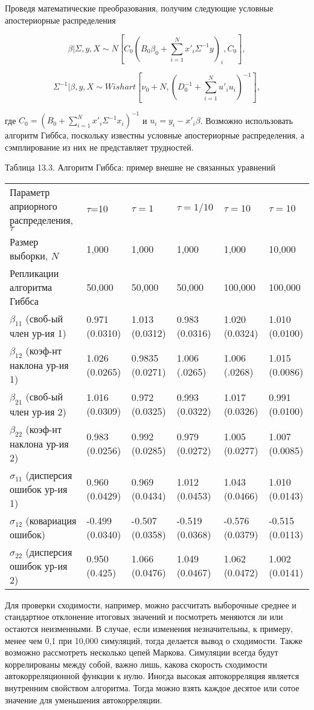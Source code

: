Проведя математические преобразования, получим следующие условные апостериорные распределения

\[
\beta|\Sigma,y,X{\sim}N\left[C_{0}\left(B_{0}\beta_{0}+\sum^{N}_{i=1}x'_{i}\Sigma^{-1}y\right)_{i},C_0\right], 
\]

\[
\Sigma^{-1}|\beta,y,X{\sim} Wishart \left[\nu_{0}+N,\left(D^{-1}_0+\sum^{N}_{i=1}u'_{i}u_{i}\right)^{-1}\right], 
\]

где $C_0=(B_{0}+\sum^{N}_{i=1}x'_{i}\Sigma^{-1}x_i)^{-1}$ и $u_{i}=y_{i}-x'_{i}\beta$. Возможно использовать алгоритм Гиббса, поскольку известны условные апостериорные распределения, а  сэмплирование из них не представляет трудностей.

Таблица 13.3. Алгоритм Гиббса: пример внешне не связанных уравнений

\begin{tabular}{p{4cm}p{2cm}p{2cm}p{2cm}p{2cm}p{2cm}}
\hline 
Параметр априорного распределения, $\tau$ & $\tau$=10 & $\tau=1$ & $\tau=1/10$ & $\tau=10$ & $\tau=10$ \\ 
Размер выборки, $N$ & 1,000 & 1,000 & 1,000 & 1,000 & 10,000 \\ 
Репликации алгоритма Гиббса & 50,000 & 50,000 & 50,000 & 100,000 & 100,000 \\ 
\hline 
$\beta_{11}$ (своб-ый член ур-ия 1) &  0.971 (0.0310) & 1.013 (0.0312) & 0.983 (0.0316) & 1.020 (0.0324) & 1.010 (0.0100) \\ 
$\beta_{12}$ (коэф-нт наклона ур-ия 1) & 1.026 (0.0265) & 0.9835 (0.0271) & 1.006 (.0265) & 1.006 (.0268) & 1.015 (0.0086) \\ 
$\beta_{21}$ (своб-ый член ур-ия 2) & 1.016 (0.0309) & 0.972 (0.0325) & 0.993 (0.0322) & 1.017 (0.0326) & 0.991 (0.0100) \\ 
$\beta_{22}$ (коэф-нт наклона ур-ия 2) & 0.983 (0.0256) & 0.992 (0.0285) & 0.979 (0.0272) & 1.005 (0.0277) & 1.007 (0.0085) \\ 
$\sigma_{11}$ (дисперсия ошибок ур-ия 1) & 0.960 (0.0429) & 0.969 (0.0434) & 1.012 (0.0453) & 1.043 (0.0466) & 1.010 (0.0143) \\ 
$\sigma_{12}$ (ковариация ошибок) & -0.499 (0.0340) & -0.507 (0.0358) & -0.519 (0.0368) & -0.576 (0.0379) & -0.515 (0.0113) \\ 
$\sigma_{22}$ (дисперсия ошибок ур-ия 2) & 0.950 (0.425) & 1.066 (0.0476) & 1.049 (0.0467) & 1.062 (0.0472) & 1.002 (0.0141) \\ 
\hline 
\end{tabular} 

Для проверки сходимости, например, можно рассчитать выборочные среднее и стандартное отклонение итоговых значений и посмотреть меняются ли  или остаются неизменными. В случае, если изменения незначительны, к примеру, менее чем 0,1 при 10,000 симуляций, тогда делается вывод о сходимости. Также возможно рассмотреть несколько цепей Маркова. Симуляции всегда будут коррелированы между собой, важно лишь, какова скорость сходимости автокорреляционной функции к нулю. Иногда высокая автокорреляция является внутренним свойством алгоритма. Тогда можно взять каждое десятое или сотое значение для уменьшения автокорреляции. 

